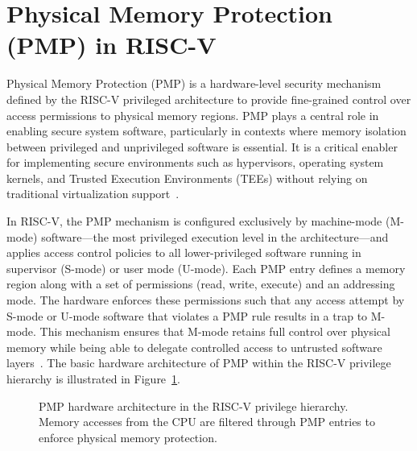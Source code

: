 \section{Physical Memory Protection (PMP) in RISC-V}
\label{sec:pmp}

Physical Memory Protection (PMP) is a hardware-level security mechanism defined by the RISC-V privileged architecture to provide fine-grained control over access permissions to physical memory regions. PMP plays a central role in enabling secure system software, particularly in contexts where memory isolation between privileged and unprivileged software is essential. It is a critical enabler for implementing secure environments such as hypervisors, operating system kernels, and Trusted Execution Environments (TEEs) without relying on traditional virtualization support~\cite{riscvprivspec}.

In RISC-V, the PMP mechanism is configured exclusively by machine-mode (M-mode) software—the most privileged execution level in the architecture—and applies access control policies to all lower-privileged software running in supervisor (S-mode) or user mode (U-mode). Each PMP entry defines a memory region along with a set of permissions (read, write, execute) and an addressing mode. The hardware enforces these permissions such that any access attempt by S-mode or U-mode software that violates a PMP rule results in a trap to M-mode. This mechanism ensures that M-mode retains full control over physical memory while being able to delegate controlled access to untrusted software layers~\cite{riscvprivspec,Lee2019}.
The basic hardware architecture of PMP within the RISC-V privilege hierarchy is illustrated in Figure~\ref{fig:pmp-arch}.

\begin{figure}[htbp]
\centering
{}
\caption{PMP hardware architecture in the RISC‑V privilege hierarchy. Memory accesses from the CPU are filtered through PMP entries to enforce physical memory protection.}
\label{fig:pmp-arch}
\end{figure}

